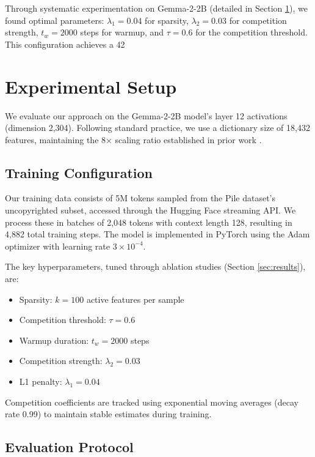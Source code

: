 \documentclass{article} %
\begin{document}
Through systematic experimentation on Gemma-2-2B (detailed in Section \ref{sec:experimental}), we found optimal parameters: $\lambda_1=0.04$ for sparsity, $\lambda_2=0.03$ for competition strength, $t_w=2000$ steps for warmup, and $\tau=0.6$ for the competition threshold. This configuration achieves a 42%

\section{Experimental Setup}
\label{sec:experimental}

We evaluate our approach on the Gemma-2-2B model's layer 12 activations (dimension 2,304). Following standard practice, we use a dictionary size of 18,432 features, maintaining the 8× scaling ratio established in prior work \cite{bussmannBatchTopKSparseAutoencoders2024}.

\subsection{Training Configuration}

Our training data consists of 5M tokens sampled from the Pile dataset's uncopyrighted subset, accessed through the Hugging Face streaming API. We process these in batches of 2,048 tokens with context length 128, resulting in 4,882 total training steps. The model is implemented in PyTorch using the Adam optimizer with learning rate $3 \times 10^{-4}$.

The key hyperparameters, tuned through ablation studies (Section \ref{sec:results}), are:
\begin{itemize}
    \item Sparsity: $k=100$ active features per sample
    \item Competition threshold: $\tau = 0.6$ 
    \item Warmup duration: $t_w = 2000$ steps
    \item Competition strength: $\lambda_2 = 0.03$
    \item L1 penalty: $\lambda_1 = 0.04$
\end{itemize}

Competition coefficients are tracked using exponential moving averages (decay rate 0.99) to maintain stable estimates during training.

\subsection{Evaluation Protocol}
\end{document}
